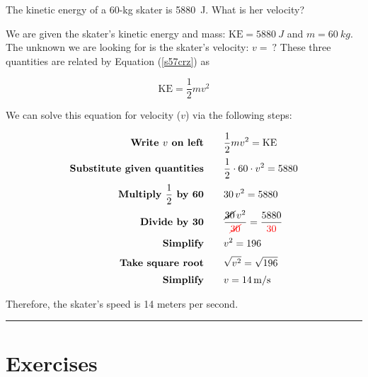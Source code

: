 \documentclass{article}
\begin{document}
\begin{example} \label{PUlJG6}
The kinetic energy of a 60-kg skater is \SI{5880}{J}. What is her velocity?
\end{example}


 We are given the skater's kinetic energy and mass: $\mathrm{KE} = \SI{5880}{J}$ and $m = \SI{60}{kg}$. The unknown we are looking for is the skater's velocity: $v =\ ?$ These three quantities are related by Equation (\ref{s57crz}) as

\begin{equation*}
    \mathrm{KE} = \frac{1}{2} m v^2
\end{equation*}

We can solve this equation for velocity ($v$) via the following steps:

\begin{align*}
    \textbf{Write $v$ on left} \qquad & \frac{1}{2} m v^2 = \mathrm{KE}\\[0.5ex]
    \textbf{Substitute given quantities} \qquad & \frac{1}{2} \cdot 60 \cdot v^2 = 5880\\[0.5ex]
    \textbf{Multiply $\frac{1}{2}$ by 60} \qquad & 30\,v^2 = 5880\\[0.5ex]
    \textbf{Divide by 30} \qquad & \frac{\cancel{30}\,v^2}{\textcolor{red}{\cancel{30}}} = \frac{5880}{\textcolor{red}{30}}\\[0.5ex]
    \textbf{Simplify} \qquad & v^2 = 196\\[0.5ex]
    \textbf{Take square root} \qquad & \sqrt{v^2} = \sqrt{196}\\[0.5ex]
    \textbf{Simplify} \qquad & v = \SI{14}{m/s}\\
\end{align*}

Therefore, the skater's speed is 14 meters per second.

\hrule

\section{Exercises}

\begin{center}
\end{center}
\end{document}
